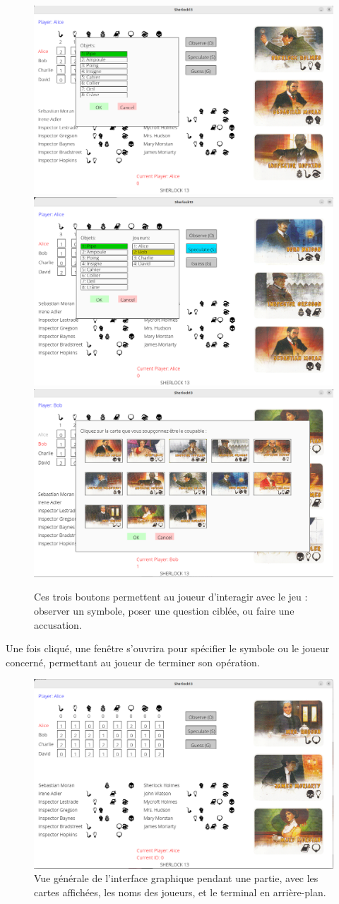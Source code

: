 \documentclass{article}
\begin{document}
\begin{figure}[H]
    \centering
    \includegraphics[width=0.3\linewidth]{images/Button_O.png}
    \includegraphics[width=0.3\linewidth]{images/Button_S.png}
    \includegraphics[width=0.3\linewidth]{images/Button_G.png}
    \caption{Ces trois boutons permettent au joueur d'interagir avec le jeu : observer un symbole, poser une question ciblée, ou faire une accusation.}
\end{figure}
    
Une fois cliqué, une fenêtre s'ouvrira pour spécifier le symbole ou le joueur concerné, permettant au joueur de terminer son opération.
    
\begin{figure}[H]
    \centering
    \includegraphics[width=0.95\linewidth]{images/Interface.png}
    \caption{Vue générale de l'interface graphique pendant une partie, avec les cartes affichées, les noms des joueurs, et le terminal en arrière-plan.}
\end{figure}
    
\end{document}
